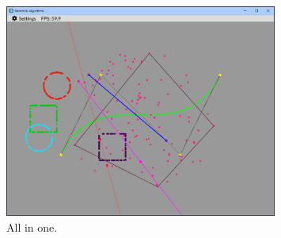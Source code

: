 \documentclass[12pt,a4paper,english]{article}
\begin{document}
\begin{figure}[H]
    \centering
    \includegraphics[width=0.8\textwidth]{all_in_one}
    \caption[]{All in one.}
    \label{fig:all_in_one}
\end{figure}
\end{document}
